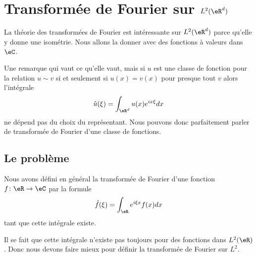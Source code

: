 \section{Transformée de Fourier sur \( L^2(\eR^d)\)}

La théorie des transformées de Fourier est intéressante sur \( L^2(\eR^d)\) parce qu'elle y donne une isométrie. Nous allons la donner avec des fonctions à valeurs dans \( \eC\).

\begin{remark}
	Une remarque qui vaut ce qu'elle vaut, mais si \( u\) est une classe de fonction pour la relation \( u\sim v\) si et seulement si \( u (x)=v(x)\) pour presque tout \( v\) alors l'intégrale
	\begin{equation}
		\hat u(\xi)=\int_{\eR^d}u(x) e^{ix\xi}dx
	\end{equation}
	ne dépend pas du choix du représentant. Nous pouvons donc parfaitement parler de transformée de Fourier d'une classe de fonctions.
\end{remark}

\subsection{Le problème}

Nous avons défini en général la transformée de Fourier d'une fonction \( f\colon \eR\to \eC\) par la formule
\begin{equation}        \label{EQooOPLJooEkqRuC}
	\hat f(\xi)=\int_{\eR} e^{i\xi x } f(x)dx
\end{equation}
tant que cette intégrale existe.

Il se fait que cette intégrale n'existe pas toujours pour des fonctions dans \( L^2(\eR)\). Donc nous devons faire mieux pour définir la transformée de Fourier sur \( L^2\).

